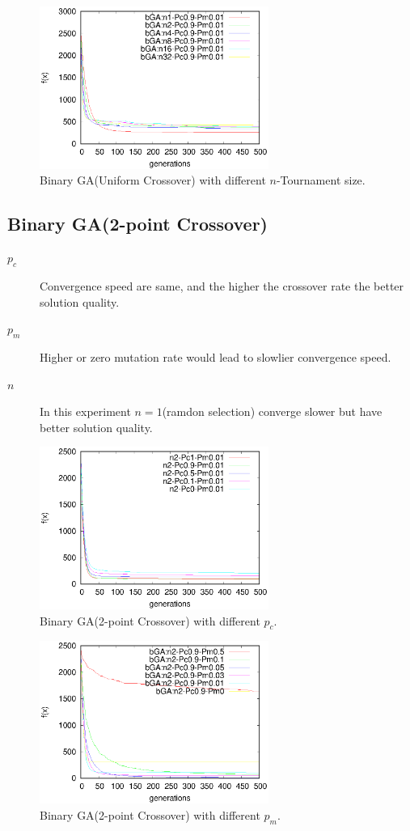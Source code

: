 ﻿\documentclass[conference]{IEEEtran}
\begin{document}
\begin{CJK}{UTF8}{bsmi}
\begin{figure}[htbp]
\centerline{\includegraphics[width=7.5cm]{fig/bGA/change_n_uni.eps}}
\caption{Binary GA(Uniform Crossover) with different $n$-Tournament size.}
\label{fig}
\end{figure}

\subsection{Binary GA(2-point Crossover)}
\begin{description}
\item [$p_{c}$] Convergence speed are same, and the higher the crossover rate the better solution quality.
\item [$p_{m}$] Higher or zero mutation rate would lead to slowlier convergence speed.
\item [$n$] In this experiment $n=1$(ramdon selection) converge slower but have better solution quality.
\end{description}

\begin{figure}[htbp]
\centerline{\includegraphics[width=7.5cm]{fig/bGA/change_pc_2pt.eps}}
\caption{Binary GA(2-point Crossover) with different $p_{c}$.}
\label{fig}
\end{figure}

\begin{figure}[htbp]
\centerline{\includegraphics[width=7.5cm]{fig/bGA/change_pm_2pt.eps}}
\caption{Binary GA(2-point Crossover) with different $p_{m}$.}
\label{fig}
\end{figure}


\end{CJK}
\end{document}

